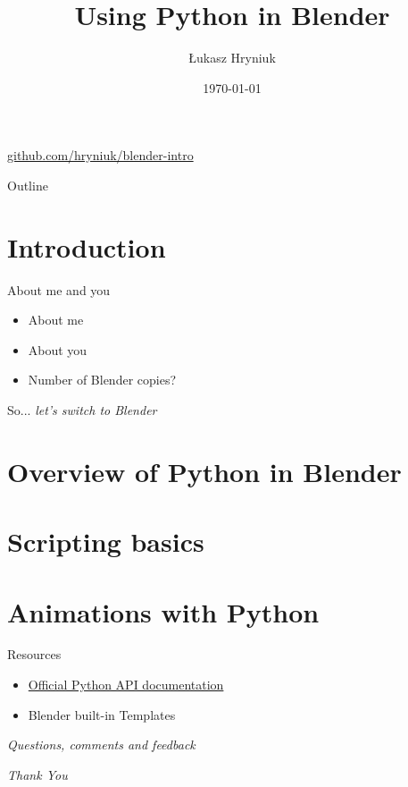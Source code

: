 \documentclass{beamer}
\title[Python in Blender]{Using Python in Blender}
\author{Łukasz Hryniuk}
\date{\today}
\begin{document}
\begin{frame}
  \titlepage
  \centering\href{https://github.com/hryniuk/blender-intro}{github.com/hryniuk/blender-intro}
\end{frame}

\begin{frame}{Outline}
  \tableofcontents
\end{frame}

\section{Introduction}

\begin{frame}{About me and you}

\begin{itemize}
\item About me
\item About you
\item Number of Blender copies?
\end{itemize}

\end{frame}


\begin{frame}{So...}
  \centering \Huge
  \emph{let's switch to Blender}
\end{frame}

\section{Overview of Python in Blender}

\section{Scripting basics}

\section{Animations with Python}

\begin{frame}{Resources}

\begin{itemize}
\item \href{https://docs.blender.org/api/current/}{Official Python API documentation}
\item Blender built-in Templates
\end{itemize}

\end{frame}

\begin{frame}{}
  \centering \Huge
  \emph{Questions, comments and feedback}
\end{frame}

\begin{frame}{}
  \centering \Huge
  \emph{Thank You}
\end{frame}
\end{document}
